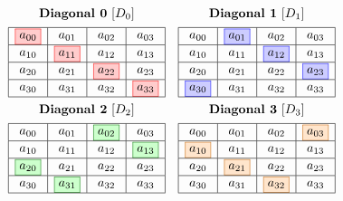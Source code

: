 \[
\begin{array}{cc}
\textbf{Diagonal 0}~[D_0] & \textbf{Diagonal 1}~[D_1] \\[1ex]
\begin{array}{|c|c|c|c|}
\hline
\fcolorbox{red}{red!20}{$a_{00}$} & a_{01} & a_{02} & a_{03} \\
\hline
a_{10} & \fcolorbox{red}{red!20}{$a_{11}$} & a_{12} & a_{13} \\
\hline
a_{20} & a_{21} & \fcolorbox{red}{red!20}{$a_{22}$} & a_{23} \\
\hline
a_{30} & a_{31} & a_{32} & \fcolorbox{red}{red!20}{$a_{33}$} \\
\hline
\end{array}
&
\begin{array}{|c|c|c|c|}
\hline
a_{00} & \fcolorbox{blue}{blue!20}{$a_{01}$} & a_{02} & a_{03} \\
\hline
a_{10} & a_{11} & \fcolorbox{blue}{blue!20}{$a_{12}$} & a_{13} \\
\hline
a_{20} & a_{21} & a_{22} & \fcolorbox{blue}{blue!20}{$a_{23}$} \\
\hline
\fcolorbox{blue}{blue!20}{$a_{30}$} & a_{31} & a_{32} & a_{33} \\
\hline
\end{array}
\\[6ex]
\textbf{Diagonal 2}~[D_2] & \textbf{Diagonal 3}~[D_3] \\[1ex]
\begin{array}{|c|c|c|c|}
\hline
a_{00} & a_{01} & \fcolorbox{green!50!black}{green!20}{$a_{02}$} & a_{03} \\
\hline
a_{10} & a_{11} & a_{12} & \fcolorbox{green!50!black}{green!20}{$a_{13}$} \\
\hline
\fcolorbox{green!50!black}{green!20}{$a_{20}$} & a_{21} & a_{22} & a_{23} \\
\hline
a_{30} & \fcolorbox{green!50!black}{green!20}{$a_{31}$} & a_{32} & a_{33} \\
\hline
\end{array}
&
\begin{array}{|c|c|c|c|}
\hline
a_{00} & a_{01} & a_{02} & \fcolorbox{orange!80!black}{orange!20}{$a_{03}$} \\
\hline
\fcolorbox{orange!80!black}{orange!20}{$a_{10}$} & a_{11} & a_{12} & a_{13} \\
\hline
a_{20} & \fcolorbox{orange!80!black}{orange!20}{$a_{21}$} & a_{22} & a_{23} \\
\hline
a_{30} & a_{31} & \fcolorbox{orange!80!black}{orange!20}{$a_{32}$} & a_{33} \\
\hline
\end{array}
\end{array}
\]


